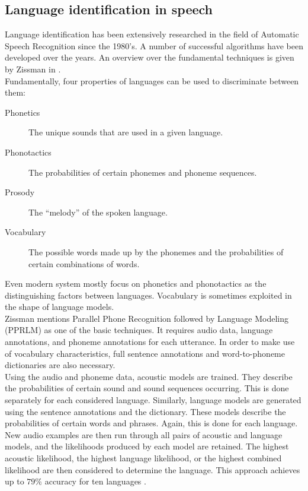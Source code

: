 \subsection{Language identification in speech}
Language identification has been extensively researched in the field of Automatic Speech Recognition since the 1980's. A number of successful algorithms have been developed over the years. An overview over the fundamental techniques is given by Zissman in \cite{zissman}.\\
Fundamentally, four properties of languages can be used to discriminate between them:
\begin{description}
 \item[Phonetics] The unique sounds that are used in a given language.
 \item[Phonotactics] The probabilities of certain phonemes and phoneme sequences.
 \item[Prosody] The ``melody'' of the spoken language.
 \item[Vocabulary] The possible words made up by the phonemes and the probabilities of certain combinations of words.
\end{description}
Even modern system mostly focus on phonetics and phonotactics as the distinguishing factors between languages. Vocabulary is sometimes exploited in the shape of language models.\\
Zissman mentions Parallel Phone Recognition followed by Language Modeling (PPRLM) as one of the basic techniques. It requires audio data, language annotations, and phoneme annotations for each utterance. In order to make use of vocabulary characteristics, full sentence annotations and word-to-phoneme dictionaries are also necessary.\\
Using the audio and phoneme data, acoustic models are trained. They describe the probabilities of certain sound and sound sequences occurring. This is done separately for each considered language. Similarly, language models are generated using the sentence annotations and the dictionary. These models describe the probabilities of certain words and phrases. Again, this is done for each language.\\
New audio examples are then run through all pairs of acoustic and language models, and the likelihoods produced by each model are retained. The highest acoustic likelihood, the highest language likelihood, or the highest combined likelihood are then considered to determine the language. This approach achieves up to $79\%$ accuracy for ten languages \cite{muthusamy}.\\

